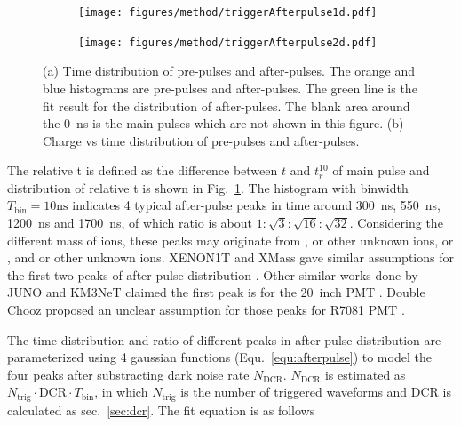 \begin{figure}[!htbp]
    \centering
    \begin{subfigure}[t]{\LF\textwidth}
        \texttt{[image: figures/method/triggerAfterpulse1d.pdf]}
        \caption{}%
        \label{fig:afterpulse1d}
    \end{subfigure}
    \begin{subfigure}[t]{\LF\textwidth}
        \texttt{[image: figures/method/triggerAfterpulse2d.pdf]}
        \caption{}
        \label{fig:afterpulse2d}
    \end{subfigure}
    \caption{(a) Time distribution of pre-pulses and after-pulses. The orange and blue histograms are pre-pulses and after-pulses. The green line is the fit result for the distribution of after-pulses. The blank area around the \SI{0}{ns} is the main pulses which are not shown in this figure. (b) Charge vs time distribution of pre-pulses and after-pulses.}
\end{figure}

The relative t is defined as the difference between $t$ and $t_r^{10}$ of main pulse and distribution of relative t is shown in Fig.~\ref{fig:afterpulse1d}. The histogram with binwidth $T_{\mathrm{bin}}=10\mathrm{ns}$ indicates 4 typical after-pulse peaks in time around \SI{300}{ns}, \SI{550}{ns}, \SI{1200}{ns} and \SI{1700}{ns}, of which ratio is about $1:\sqrt{3}:\sqrt{16}:\sqrt{32}$. Considering the different mass of ions, these peaks may originate from ,  or other unknown ions,  or , and  or other unknown ions. XENON1T and XMass gave similar assumptions for the first two peaks of after-pulse distribution \cite{XENON1TTesting, Abe_2020}. Other similar works done by JUNO and KM3NeT claimed the first peak is  for the \SI{20}{inch} PMT \cite{Zhao:2022gks,KM3NetTesting}. Double Chooz proposed an unclear assumption for those peaks for R7081 PMT \cite{Haser_2013}.

The time distribution and ratio of different peaks in after-pulse distribution are parameterized using 4 gaussian functions (Equ.~\eqref{equ:afterpulse}) to model the four peaks after substracting dark noise rate $N_{\mathrm{DCR}}$. $N_{\mathrm{DCR}}$ is estimated as $N_{\mathrm{trig}}\cdot \mathrm{DCR}\cdot T_{\mathrm{bin}}$, in which $N_{\mathrm{trig}}$ is the number of triggered waveforms and DCR is calculated as sec.~\ref{sec:dcr}. The fit equation is as follows


